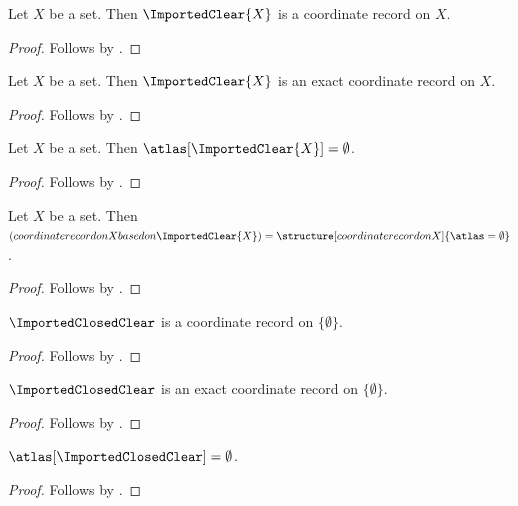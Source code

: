 

\begin{proposition}\label{imported_clear_result}
    Let $X$ be a set.
    Then $\ImportedClear{X}$ is a coordinate record on $X$.
\end{proposition}
\begin{proof}
    Follows by .
\end{proof}

\begin{proposition}\label{imported_clear_shape}
    Let $X$ be a set.
    Then $\ImportedClear{X}$ is an exact coordinate record on $X$.
\end{proposition}
\begin{proof}
    Follows by .
\end{proof}

\begin{proposition}\label{imported_clear_atlas}
    Let $X$ be a set.
    Then $\atlas[\ImportedClear{X}]=\emptyset$.
\end{proposition}
\begin{proof}
    Follows by .
\end{proof}

\begin{proposition}\label{imported_clear_reconstruction}
    Let $X$ be a set.
    Then $(coordinate record on X based on \ImportedClear{X})=
        \structure[coordinate record on X]{\atlas=\emptyset}$.
\end{proposition}
\begin{proof}
    Follows by .
\end{proof}

\begin{proposition}\label{imported_closed_result}
    $\ImportedClosedClear$ is a coordinate record on $\{\emptyset\}$.
\end{proposition}
\begin{proof}
    Follows by .
\end{proof}

\begin{proposition}\label{imported_closed_shape}
    $\ImportedClosedClear$ is an exact coordinate record on $\{\emptyset\}$.
\end{proposition}
\begin{proof}
    Follows by .
\end{proof}

\begin{proposition}\label{imported_closed_atlas}
    $\atlas[\ImportedClosedClear]=\emptyset$.
\end{proposition}
\begin{proof}
    Follows by .
\end{proof}
